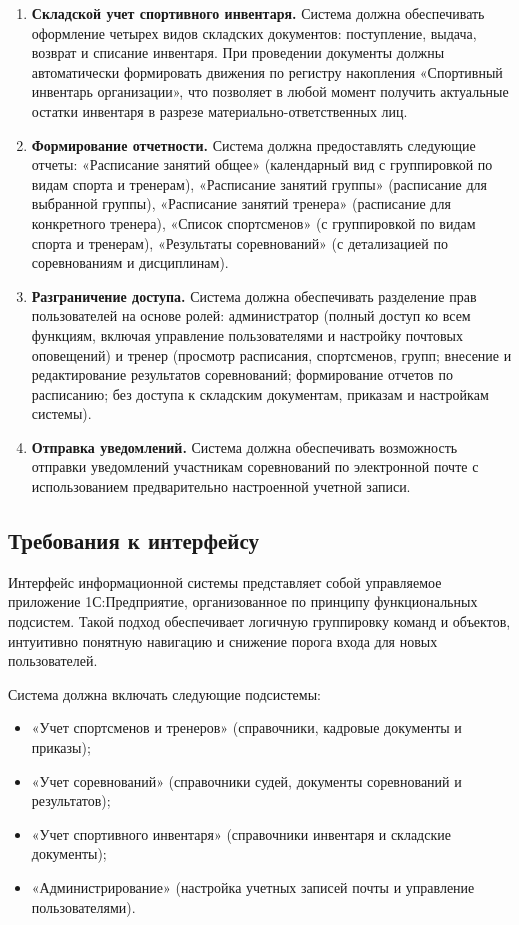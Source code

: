 \begin{enumerate}
	\item \textbf{Складской учет спортивного инвентаря.} Система должна обеспечивать оформление четырех видов складских документов: поступление, выдача, возврат и списание инвентаря. При проведении документы должны автоматически формировать движения по регистру накопления «Спортивный инвентарь организации», что позволяет в любой момент получить актуальные остатки инвентаря в разрезе материально-ответственных лиц.
	
	\item \textbf{Формирование отчетности.} Система должна предоставлять следующие отчеты: «Расписание занятий общее» (календарный вид с группировкой по видам спорта и тренерам), «Расписание занятий группы» (расписание для выбранной группы), «Расписание занятий тренера» (расписание для конкретного тренера), «Список спортсменов» (с группировкой по видам спорта и тренерам), «Результаты соревнований» (с детализацией по соревнованиям и дисциплинам).
	
	\item \textbf{Разграничение доступа.} Система должна обеспечивать разделение прав пользователей на основе ролей: администратор (полный доступ ко всем функциям, включая управление пользователями и настройку почтовых оповещений) и тренер (просмотр расписания, спортсменов, групп; внесение и редактирование результатов соревнований; формирование отчетов по расписанию; без доступа к складским документам, приказам и настройкам системы).
	
	\item \textbf{Отправка уведомлений.} Система должна обеспечивать возможность отправки уведомлений участникам соревнований по электронной почте с использованием предварительно настроенной учетной записи.
\end{enumerate}

\subsection{Требования к интерфейсу}

Интерфейс информационной системы представляет собой управляемое приложение 1С:Предприятие, организованное по принципу функциональных подсистем. Такой подход обеспечивает логичную группировку команд и объектов, интуитивно понятную навигацию и снижение порога входа для новых пользователей.

Система должна включать следующие подсистемы:

\begin{itemize}
	\item «Учет спортсменов и тренеров» (справочники, кадровые документы и приказы);
	\item «Учет соревнований» (справочники судей, документы соревнований и результатов);
	\item «Учет спортивного инвентаря» (справочники инвентаря и складские документы);
	\item «Администрирование» (настройка учетных записей почты и управление пользователями).
\end{itemize}

